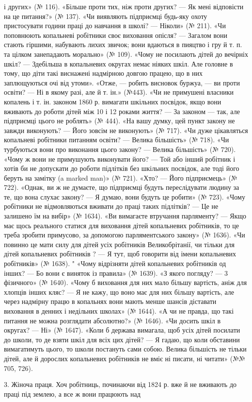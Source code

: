 і других» (№ 116). «Більше проти тих, ніж проти других? — Як
мені відповісти на це питання?» (№ 137). «Чи виявляють підприємці
будь-яку охоту пристосувати години праці до навчання
в школі? — Ніколи» (№ 211). «Чи поповнюють копальневі
робітники своє виховання опісля? — Загалом вони стають гіршими,
набувають лихих звичок; вони вдаються в пияцтво і гру
й т. п. та цілком занепадають морально» (№ 109). «Чому не посилають
дітей до вечірніх шкіл? — Здебільша в копальневих округах
немає ніяких шкіл. Але головне в тому, що діти такі виснажені
надмірною довгою працею, що в них заплющуються очі від утоми».
«Отже, — робить висновок буржуа, — ви проти освіти? — Ні в
якому разі, але й т. ін.» (№443). «Чи не примушені власники
копалень і т. ін. законом 1860 р. вимагати шкільних посвідок,
якщо вони вживають до роботи дітей між 10 і 12 роками життя? —
За законом — так, але підприємці цього не роблять» (№ 444).
«На вашу думку, цей пункт закону не завжди виконують? —
Його зовсім не виконують» (№ 717). «Чи дуже цікавляться копальневі
робітники питанням освіти? — Велика більшість» (№ 718).
«Чи турбуються вони про виконання цього закону? — Велика
більшість» (№ 720). «Чому ж вони не примушують виконувати
його? — Той або інший робітник і хотів би не допускати до роботи
підлітків без шкільних посвідок, але тоді його беруть на замітку
(a marked man)» (№ 721). «Хто? — Його підприємець» (№ 722).
«Однак, ви ж не думаєте, що підприємці будуть переслідувати
людину за те, що вона слухає закону? — Я думаю, вони будуть
це робити» (№ 723). «Чому робітники не відмовляються вживати
до праці таких підлітків? — Це не залишено їм на вибір» (№ 1634).
«Ви вимагаєте втручання парляменту? — Якщо має щось реального
статися для виховання дітей копальневих робітників, то
це треба зробити примусово, за допомогою парляментського закону»
(№ 1636). «Чи повинно це мати силу для дітей усіх робітників
Великобрітанії, чи тільки для дітей копальневих робітників
? — Я тут, щоб говорити від імени копальневих робітників»
(№ 1638). " «Чому відрізняти дітей копальневих робітників од
інших? — Бо вони є виняток із правила» (№ 1639). «З якого
погляду? — 3 фізичного» (№ 1640). «Чому б виховання для них
мало більшу вартість, аніж для хлопців інших кляс? — Я не
кажу, що воно має для них більшу вартість, але через надмірну
працю в копальнях вони мають менше шансів діставати виховання
в денних і недільних школах» (№ 1644). «А чи не правда,
що такі питання не можна розглядати абсолютно?» (№ 1646).
«Чи досить шкіл в округах? — Ні» (№ 1647). «Коли б держава
вимагала, щоб усіх дітей посилати до школи, то де взяти шкіл
для всіх цих дітей? — Я гадаю, що коли обставини вимагатимуть
цього, то школи постануть сами собою. Велика більшість
не тільки дітей, але й дорослих копальневих робітників не вміє
ні писати, ні читати» (№№ 705, 726).

3. Жіноча праця. Хоч робітниць, починаючи від 1824 р. вже
й не вживають до праці під землею, а все ж вони працюють над
